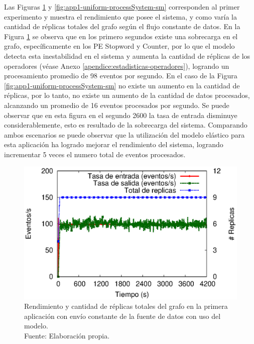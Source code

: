 
Las Figuras \ref{fig:app1-uniform-processSystem-cm} y \ref{fig:app1-uniform-processSystem-sm} \normalsize{corresponden al primer experimento y muestra el rendimiento que posee el sistema, y como varía la cantidad de réplicas totales del grafo según el flujo constante de datos.} En la Figura \ref{fig:app1-uniform-processSystem-cm} \normalsize{se observa que en los primero segundos existe una sobrecarga en el grafo, específicamente en los PE Stopword y Counter, por lo que el modelo detecta esta inestabilidad en el sistema y aumenta la cantidad de réplicas de los operadores} (véase Anexo \ref{apendice:estadisticas-operadores}), \normalsize{logrando un procesamiento promedio de  98 eventos por segundo.} En el caso de la Figura \ref{fig:app1-uniform-processSystem-sm} \normalsize{no existe un aumento en la cantidad de réplicas, por lo tanto, no existe un aumento de la cantidad de datos procesados, alcanzando un promedio de 16 eventos procesados por segundo. Se puede observar que en esta figura en el segundo 2600 la tasa de entrada disminuye considerablemente, esto es resultado de la sobrecarga del sistema. Comparando ambos escenarios se puede observar que la utilización del modelo elástico para esta aplicación ha logrado mejorar el rendimiento del sistema, logrando incrementar 5 veces el numero total de eventos procesados.}

\begin{figure}[!ht]
	\centering
	\captionsetup{justification=centering}
	\includegraphics[scale=0.65]{images/exp/app1/uniform/cm/processSystem.eps}
    \caption[Rendimiento y cantidad de réplicas totales del grafo en la primera aplicación con envío constante de la fuente de datos con uso del modelo.]{Rendimiento y cantidad de réplicas totales del grafo en la primera aplicación con envío constante de la fuente de datos con uso del modelo.\\Fuente: Elaboración propia.}
	\label{fig:app1-uniform-processSystem-cm}
\end{figure}

